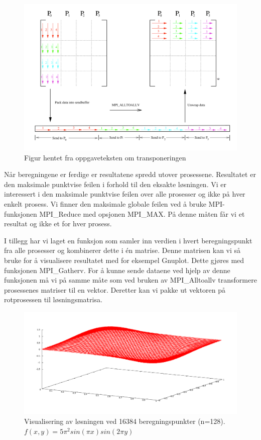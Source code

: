 \documentclass[11pt,norsk,a4paper]{article}
\begin{document}
\begin{figure}[h]
\centering
\includegraphics[scale=0.3]{transpose.png}
\caption{Figur hentet fra oppgaveteksten om transponeringen}
\end{figure}

Når beregningene er ferdige er resultatene spredd utover prosessene. Resultatet er den maksimale punktvise feilen i forhold til den eksakte løsningen. Vi er interessert i den maksimale punktvise feilen over alle prosesser og ikke på hver enkelt prosess. Vi finner den maksimale globale feilen ved å bruke MPI-funksjonen MPI\_Reduce med opsjonen MPI\_MAX. På denne måten får vi et resultat og ikke et for hver prosess.

I tillegg har vi laget en funksjon som samler inn verdien i hvert beregningspunkt fra alle prosesser og kombinerer dette i én matrise. Denne matrisen kan vi så bruke for å visualisere resultatet med for eksempel Gnuplot\cite{gnuplot}. Dette gjøres med funksjonen MPI\_Gatherv. For å kunne sende dataene ved hjelp av denne funksjonen må vi på samme måte som ved bruken av MPI\_Alltoallv transformere prosessenes matriser til en vektor. Deretter kan vi pakke ut vektoren på rotprosessen til løsningsmatrisa.

\begin{figure}[h]
\centering
\includegraphics[scale=0.25]{plot_n128.png}
\caption{Visualisering av løsningen ved 16384 beregningspunkter (n=128). $f(x,y)=5\pi^2sin(\pi x)sin(2\pi y)$}
\end{figure}
\end{document}
